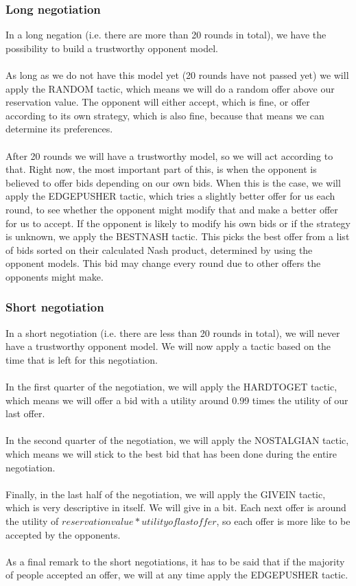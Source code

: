 \subsubsection{Long negotiation}
In a long negation (i.e. there are more than 20 rounds in total), we have the possibility to build a trustworthy opponent model.
\\\\
As long as we do not have this model yet (20 rounds have not passed yet) we will apply the RANDOM tactic, which means we will do a random offer above our reservation value. The opponent will either accept, which is fine, or offer according to its own strategy, which is also fine, because that means we can determine its preferences.
\\\\
After 20 rounds we will have a trustworthy model, so we will act according to that. Right now, the most important part of this, is when the opponent is believed to offer bids depending on our own bids. When this is the case, we will apply the EDGEPUSHER tactic, which tries a slightly better offer for us each round, to see whether the opponent might modify that and make a better offer for us to accept. If the opponent is likely to modify his own bids or if the strategy is unknown, we apply the BESTNASH tactic. This picks the best offer from a list of bids sorted on their calculated Nash product, determined by using the opponent models. This bid may change every round due to other offers the opponents might make.

\subsubsection{Short negotiation}
In a short negotiation (i.e. there are less than 20 rounds in total), we will never have a trustworthy opponent model. We will now apply a tactic based on the time that is left for this negotiation.
\\\\
In the first quarter of the negotiation, we will apply the HARDTOGET tactic, which means we will offer a bid with a utility around 0.99 times the utility of our last offer.
\\\\
In the second quarter of the negotiation, we will apply the NOSTALGIAN tactic, which means we will stick to the best bid that has been done during the entire negotiation.
\\\\
Finally, in the last half of the negotiation, we will apply the GIVEIN tactic, which is very descriptive in itself. We will give in a bit. Each next offer is around the utility of $reservation value * utility of last offer$, so each offer is more like to be accepted by the opponents.
\\\\
As a final remark to the short negotiations, it has to be said that if the majority of people accepted an offer, we will at any time apply the EDGEPUSHER tactic.

